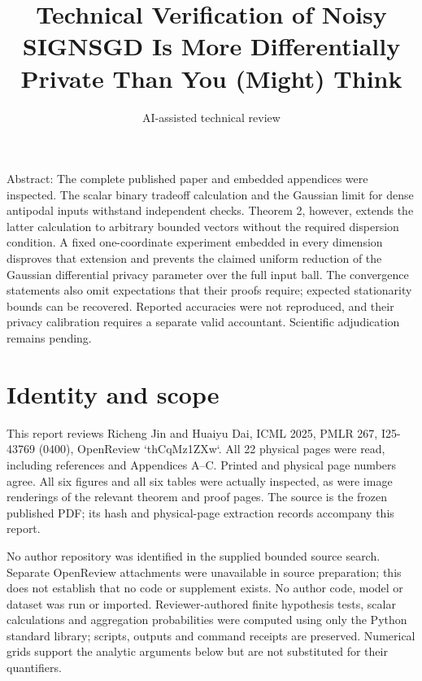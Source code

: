 \documentclass[10pt]{article}
\title{Technical Verification of Noisy SIGNSGD Is More Differentially Private Than You (Might) Think}
\author{AI-assisted technical review}
\date{}
\begin{document}
\maketitle
Abstract: The complete published paper and embedded appendices were inspected. The scalar binary tradeoff calculation and the Gaussian limit for dense antipodal inputs withstand independent checks. Theorem 2, however, extends the latter calculation to arbitrary bounded vectors without the required dispersion condition. A fixed one-coordinate experiment embedded in every dimension disproves that extension and prevents the claimed uniform reduction of the Gaussian differential privacy parameter over the full input ball. The convergence statements also omit expectations that their proofs require; expected stationarity bounds can be recovered. Reported accuracies were not reproduced, and their privacy calibration requires a separate valid accountant. Scientific adjudication remains pending.\par
\section*{Identity and scope}
This report reviews Richeng Jin and Huaiyu Dai, ICML 2025, PMLR 267, I25-43769 (0400), OpenReview `thCqMz1ZXw`. All 22 physical pages were read, including references and Appendices A–C. Printed and physical page numbers agree. All six figures and all six tables were actually inspected, as were image renderings of the relevant theorem and proof pages. The source is the frozen published PDF; its hash and physical-page extraction records accompany this report.\par
No author repository was identified in the supplied bounded source search. Separate OpenReview attachments were unavailable in source preparation; this does not establish that no code or supplement exists. No author code, model or dataset was run or imported. Reviewer-authored finite hypothesis tests, scalar calculations and aggregation probabilities were computed using only the Python standard library; scripts, outputs and command receipts are preserved. Numerical grids support the analytic arguments below but are not substituted for their quantifiers.\par
\end{document}

